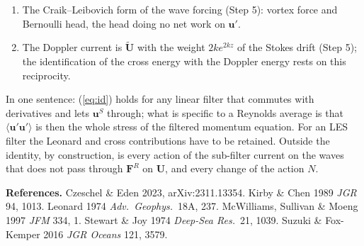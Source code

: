 \documentclass[10pt]{article}
\newcommand{\av}[1]{\langle #1\rangle}\newcommand{\uS}{\bm u^S}\newcommand{\WS}{\mathcal W_S}\newcommand{\PS}{\mathcal P_S}
\newcommand{\Ut}{\widetilde{\bm U}}
\newcommand{\bu}{\bm u}\newcommand{\bU}{\bm U}\newcommand{\bxi}{\bm\xi}\newcommand{\dd}{\mathrm d}
\begin{document}
\begin{enumerate}[leftmargin=1.6em,itemsep=1pt,topsep=1pt]
\emph{A Doppler filter of finite width.} If $\bU$ is instead defined by a spatial filter at the scale $\sim1/k$ (point 4 of the letter), with $\bU=\av\bu$ and $\bu'=\bu-\bU$, the stress in the filtered equation is $\tau^{\rm SGS}_{ij}=\av{u_iu_j}-U_iU_j=L_{ij}+C_{ij}+\av{u'_iu'_j}$, with the Leonard term $L_{ij}=\av{U_iU_j}-U_iU_j$ and the cross term $C_{ij}=\av{U_iu'_j}+\av{u'_iU_j}$ (Leonard 1974; the sum is an identity for any linear filter). The wave side sees $\tau^{\rm SGS}$ through $\partial_t\bU$; the identity has $\av{u'_iu'_j}$; the mismatch is $-\rho\,u^S_i\,\partial_j(L_{ij}+C_{ij})$. For a Reynolds average $\av{U_iU_j}=U_iU_j$ and $\av{U_iu'_j}=U_i\av{u'_j}=0$, so both vanish. For a filter of finite width both are in general non-zero, a sharp spectral cut-off included: the product of two resolved fields has content beyond the cut-off, so $L=-(1-\av\cdot)(U_iU_j)\neq0$, and $C\neq0$ even though $\av{\bu'}=0$; for a Gaussian filter $\av{\bu'}$ itself is non-zero as well.
\item The Craik--Leibovich form of the wave forcing (Step 5): vortex force and Bernoulli head, the head doing no net work on $\bu'$.
\item The Doppler current is $\Ut$ with the weight $2ke^{2kz}$ of the Stokes drift (Step 5); the identification of the cross energy with the Doppler energy rests on this reciprocity.
\end{enumerate}
In one sentence: (\ref{eq:id}) holds for any linear filter that commutes with derivatives and lets $\uS$ through; what is specific to a Reynolds average is that $\av{\bu'\bu'}$ is then the whole stress of the filtered momentum equation. For an LES filter the Leonard and cross contributions have to be retained. Outside the identity, by construction, is every action of the sub-filter current on the waves that does not pass through $\bm F^R$ on $\bU$, and every change of the action $N$.

{\footnotesize\textbf{References.} Czeschel \& Eden 2023, arXiv:2311.13354. Kirby \& Chen 1989 \textit{JGR} 94, 1013. Leonard 1974 \textit{Adv.\ Geophys.}\ 18A, 237. McWilliams, Sullivan \& Moeng 1997 \textit{JFM} 334, 1. Stewart \& Joy 1974 \textit{Deep-Sea Res.}\ 21, 1039. Suzuki \& Fox-Kemper 2016 \textit{JGR Oceans} 121, 3579.\par}
\end{document}
